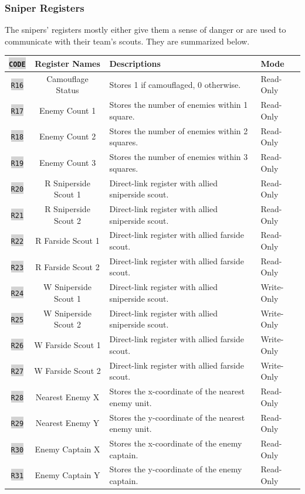 \documentclass{article}
\newcommand{\vnscode}[1]{\colorbox{lightgray}{\lstinline[language=vns]{#1}}}
\begin{document}
\subsubsection{Sniper Registers}

The snipers' registers mostly either give them a sense of danger or are used to
communicate with their team's scouts. They are summarized below.

\begin{minipage}{\textwidth}
\centering
\begin{tabular}{|c|c|l|l|}
    \hline \vnscode{CODE} & Register Names & Descriptions & Mode \\ \hline
    \vnscode{R16} & Camouflage Status & Stores 1 if camouflaged, 0 otherwise. & Read-Only \\ \hline
    \vnscode{R17} & Enemy Count 1 & Stores the number of enemies within 1 square. & Read-Only \\ \hline
    \vnscode{R18} & Enemy Count 2 & Stores the number of enemies within 2 squares. & Read-Only \\ \hline
    \vnscode{R19} & Enemy Count 3 & Stores the number of enemies within 3 squares. & Read-Only \\ \hline
    \vnscode{R20} & R Sniperside Scout 1 & Direct-link register with allied sniperside scout. & Read-Only \\ \hline
    \vnscode{R21} & R Sniperside Scout 2 & Direct-link register with allied sniperside scout. & Read-Only \\ \hline
    \vnscode{R22} & R Farside Scout 1 & Direct-link register with allied farside scout. & Read-Only \\ \hline
    \vnscode{R23} & R Farside Scout 2 & Direct-link register with allied farside scout. & Read-Only \\ \hline
    \vnscode{R24} & W Sniperside Scout 1 & Direct-link register with allied sniperside scout. & Write-Only \\ \hline
    \vnscode{R25} & W Sniperside Scout 2 & Direct-link register with allied sniperside scout. & Write-Only \\ \hline
    \vnscode{R26} & W Farside Scout 1 & Direct-link register with allied farside scout. & Write-Only \\ \hline
    \vnscode{R27} & W Farside Scout 2 & Direct-link register with allied farside scout. & Write-Only \\ \hline
    \vnscode{R28} & Nearest Enemy X & Stores the x-coordinate of the nearest enemy unit. & Read-Only \\ \hline
    \vnscode{R29} & Nearest Enemy Y & Stores the y-coordinate of the nearest enemy unit. & Read-Only \\ \hline
    \vnscode{R30} & Enemy Captain X & Stores the x-coordinate of the enemy captain. & Read-Only \\ \hline
    \vnscode{R31} & Enemy Captain Y & Stores the y-coordinate of the enemy captain. & Read-Only \\ \hline
\end{tabular}
\end{minipage}
\end{document}

